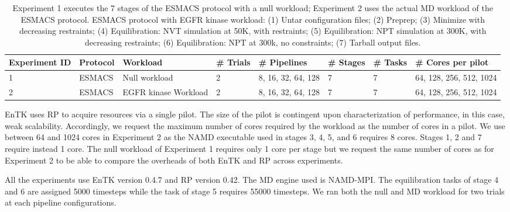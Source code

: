 \begin{table}[t]
\centering
\caption{Experiment 1 executes the 7 stages of the ESMACS protocol with
a null workload; Experiment 2 uses the actual MD workload of the ESMACS
protocol. ESMACS protocol with EGFR kinase workload: (1) Untar configuration
files; (2) Preprep; (3) Minimize with decreasing restraints; (4)
Equilibration: NVT simulation at 50K, with restraints; (5) Equilibration: NPT
simulation at 300K, with decreasing restraints; (6) Equilibration: NPT at
300k, no constraints; (7) Tarball output files.}\label{tab:exp}
\begin{tabular}{llllllll}
\toprule
\textbf{Experiment ID}      & 
\textbf{Protocol}           & 
\textbf{Workload}           & 
\textbf{\# Trials}          & 
\textbf{\# Pipelines}       & 
\textbf{\# Stages}          & 
\textbf{\# Tasks}           & 
\textbf{\# Cores per pilot} \\ 
\toprule
%
1                           & 
ESMACS                      & 
Null workload               & 
2                           & 
8, 16, 32, 64, 128          & 
7                           & 
7                           & 
64, 128, 256, 512, 1024     \\  
%
2                           & 
ESMACS                      & 
EGFR kinase Workload        & 
2                           & 
8, 16, 32, 64, 128          & 
7                           & 
7                           & 
64, 128, 256, 512, 1024     \\ 
\bottomrule
\end{tabular}
\end{table}

EnTK uses RP to acquire resources via a single pilot. The size of the pilot
is contingent upon characterization of performance, in this case, weak
scalability. Accordingly, we request the maximum number of cores required by
the workload as the number of cores in a pilot. We use between 64 and 1024
cores in Experiment 2 as the NAMD executable used in stages 3, 4, 5, and 6
requires 8 cores. Stages 1, 2 and 7 require instead 1 core. The null workload
of Experiment 1 requires only 1 core per stage but we request the same number
of cores as for Experiment 2 to be able to compare the overheads of both EnTK
and RP across experiments.

All the experiments use EnTK version 0.4.7 and RP version 0.42. The MD engine
used is NAMD-MPI\@. The equilibration tasks of stage 4 and 6 are assigned
5000 timesteps while the task of stage 5 requires 55000 timesteps. We ran
both the null and MD workload for two trials at each pipeline configurations.

